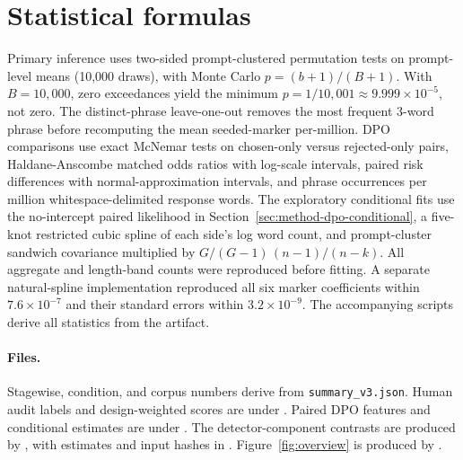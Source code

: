 \documentclass[11pt]{article}
\begin{document}
\section{Statistical formulas}
\label{app:formulas}

Primary inference uses two-sided prompt-clustered permutation tests on
prompt-level means (10{,}000 draws), with Monte Carlo
$p=(b+1)/(B+1)$. With $B=10{,}000$, zero exceedances yield the minimum
$p=1/10{,}001\approx9.999\times10^{-5}$, not zero.
The distinct-phrase leave-one-out removes the most frequent 3-word phrase before
recomputing the mean seeded-marker per-million. DPO comparisons use exact McNemar
tests on chosen-only versus rejected-only pairs, Haldane-Anscombe matched odds
ratios with log-scale intervals, paired risk differences with normal-approximation
intervals, and phrase occurrences per million whitespace-delimited response
words. The exploratory conditional fits use the no-intercept paired likelihood
in Section~\ref{sec:method-dpo-conditional}, a five-knot restricted cubic spline of each
side's log word count, and prompt-cluster sandwich covariance multiplied by
$G/(G-1)\,(n-1)/(n-k)$. All aggregate and length-band counts were reproduced
before fitting. A separate natural-spline implementation reproduced all six
marker coefficients within $7.6\times10^{-7}$ and their standard errors within
$3.2\times10^{-9}$. The accompanying scripts derive all statistics from the
artifact.

\paragraph{Files.} Stagewise, condition, and corpus numbers derive from
\texttt{summary\_v3.json}. Human audit labels and
design-weighted scores are under . Paired DPO features and
conditional estimates are under . The
detector-component contrasts are produced by
, with estimates and
input hashes in
.
Figure~\ref{fig:overview} is produced by
.
\end{document}
